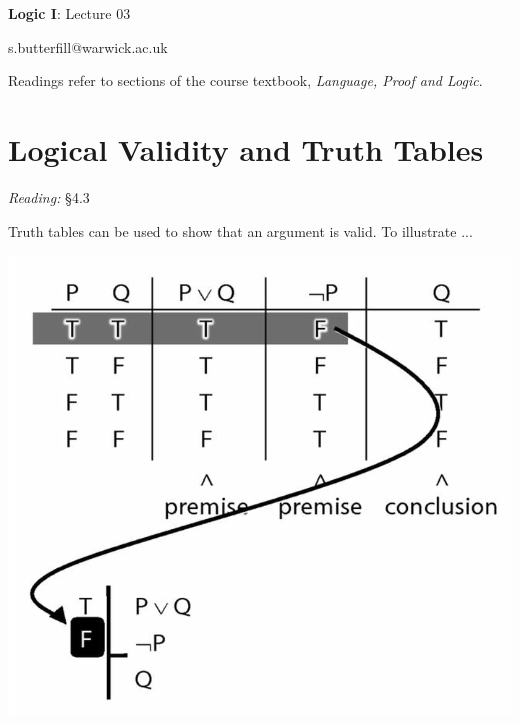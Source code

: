 \documentclass[12pt]{extarticle}
\date{}
\makeatletter
\def \ititle {Origins of Mind}
\def \isubtitle {Lecture 08}
\def \iemail{s.butterfill@warwick.ac.uk}
\makeatother
\begin{document}

\begin{multicols*}{3}

\setlength\footnotesep{1em}










\def \ititle {Logic I}
 
\def \isubtitle {Lecture 03}
 
\begin{center}
 
{\Large
 
\textbf{\ititle}: \isubtitle
 
}
 
 
 
\iemail %
 
\end{center}
 
Readings refer to sections of the course textbook, \emph{Language, Proof and Logic}.
 
 
 
\section{Logical Validity and Truth Tables}
 
\emph{Reading:} §4.3
 
\begin{minipage}{\columnwidth}
 
Truth tables can be used to show that an argument is valid. To illustrate ...
 
\begin{center}
\includegraphics[scale=0.3]{img/unit_14_example.png}
\end{center}
\end{minipage}
 

\end{multicols*}
\end{document}
